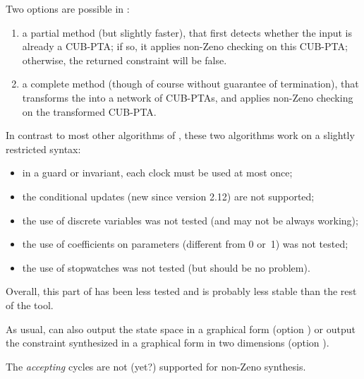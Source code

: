 
Two options are possible in \imitator{}:
\begin{enumerate}
	\item a partial method (but slightly faster), that first detects whether the input \NIPTA{} is already a CUB-PTA; if so, it applies non-Zeno checking on this CUB-PTA; otherwise, the returned constraint will be false.


	\item a complete method (though of course without guarantee of termination), that transforms the \NIPTA{} into a network of CUB-PTAs, and applies non-Zeno checking on the transformed CUB-PTA.


\end{enumerate}


\begin{becareful}[restrictions]
	In contrast to most other algorithms of \imitator{}, these two algorithms work on a slightly restricted syntax:
	\begin{itemize}
		\item in a guard or invariant, each clock must be used at most once;
		\item the conditional updates (new since version 2.12) are not supported;
		\item the use of discrete variables was not tested (and may not be always working);
		\item the use of coefficients on parameters (different from 0 or~1) was not tested;
		\item the use of stopwatches was not tested (but should be no problem).
	\end{itemize}
	Overall, this part of \imitator{} has been less tested and is probably less stable than the rest of the tool.
\end{becareful}

As usual, \imitator{} can also
output the state space in a graphical form (option )
or
output the constraint synthesized in a graphical form in two dimensions (option ).

\begin{remark}
	The \emph{accepting} cycles are not (yet?) supported for non-Zeno synthesis.
\end{remark}



